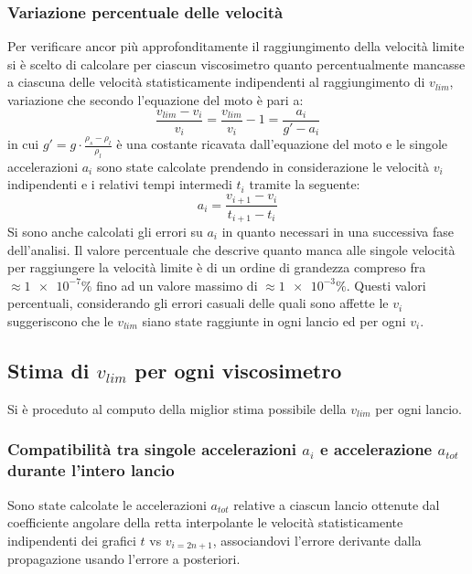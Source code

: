 \documentclass[a4paper,11pt,oneside]{article}
\begin{document}
\subsubsection*{Variazione percentuale delle velocità}
Per verificare ancor più approfonditamente il raggiungimento della velocità limite si è scelto di calcolare per ciascun viscosimetro quanto percentualmente mancasse a ciascuna delle velocità statisticamente indipendenti al raggiungimento di $v_{lim}$, variazione  che secondo l'equazione del moto è pari a:
\begin{equation*}
    \frac{v_{lim} - v_{i}}{v_{i}}=\frac{v_{lim}}{v_i}-1=\frac{a_i}{g' - a_i}
\end{equation*}
in cui $g'=g\cdot\frac{\rho_s-\rho_l}{\rho_l}$ è una costante ricavata dall'equazione del moto e le singole accelerazioni $a_i$ sono state calcolate prendendo in considerazione le velocità $v_{i}$ indipendenti e i relativi tempi intermedi $t_{i}$ tramite la seguente:
\begin{equation*}
    a_i=\frac{v_{i+1}-v_i}{t_{i+1}-t_{i}}
\end{equation*}
Si sono anche calcolati gli errori su $a_{i}$ in quanto necessari in una successiva fase dell'analisi.\newline
Il valore percentuale che descrive quanto manca alle singole velocità per raggiungere la velocità limite è di un ordine di grandezza compreso fra $\approx\num{1e-7}\%$ fino ad un valore massimo di $\approx\num{1e-3}\%$. Questi valori percentuali, considerando gli errori casuali delle quali sono affette le $v_{i}$ suggeriscono che le $v_{lim}$ siano state raggiunte in ogni lancio ed per ogni $v_{i}$.


\subsection{Stima di $v_{lim}$ per ogni viscosimetro}
Si è proceduto al computo della miglior stima possibile della $v_{lim}$ per ogni lancio.

\subsubsection*{Compatibilità tra singole accelerazioni $a_i$ e accelerazione $a_{tot}$ durante l'intero lancio}
Sono state calcolate le accelerazioni $a_{tot}$ relative a ciascun lancio ottenute dal coefficiente angolare della retta interpolante le velocità statisticamente indipendenti dei grafici $t$ vs $v_{i=2n+1}$, associandovi l'errore derivante dalla propagazione usando l'errore a posteriori.
\end{document}
